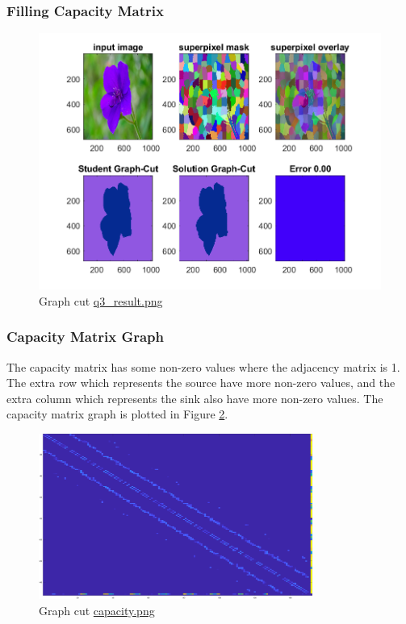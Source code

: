 \subsubsection{Filling Capacity Matrix}

\begin{figure}[htbp]
	\centering
	\includegraphics[width=\textwidth]{hw5/q3_result.png}
    \caption{Graph cut \href{./hw5/q3_result.png}{q3\_result.png}}
    \label{fig:19}
\end{figure}
\subsubsection{Capacity Matrix Graph}
The capacity matrix has some non-zero values where the adjacency matrix is 1.
The extra row which represents the source have more non-zero values, and the extra column which represents the sink also have more non-zero values.
The capacity matrix graph is plotted in Figure \ref{fig:20}.
\begin{figure}[htbp]
	\centering
	\includegraphics[width=0.8\textwidth]{hw5/capacity.png}
    \caption{Graph cut \href{./hw5/capacity.png}{capacity.png}}
    \label{fig:20}
\end{figure}


